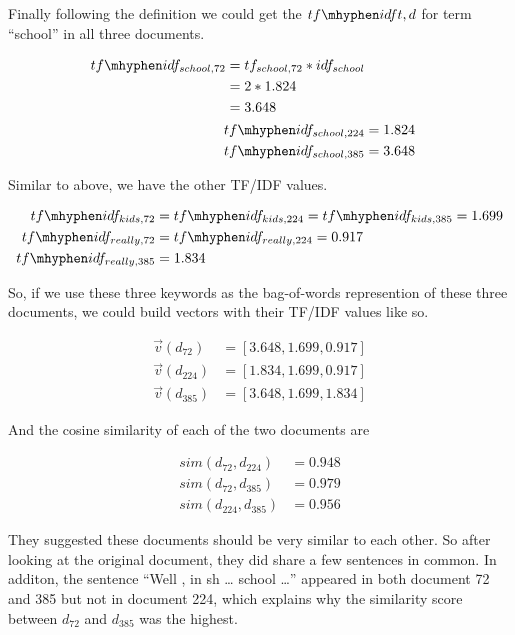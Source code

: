 \documentclass[11pt]{article} %
\begin{document}
Finally following the definition we could get the $tf\mhyphen idf{t, d}$ for term ``school'' in all three documents.

\begin{align*}
    \begin{split}
        tf\mhyphen idf_{school, 72} &= tf_{school, 72} * idf_{school} \\
            &= 2 * 1.824 \\
            &= 3.648
    \end{split}\\
    tf\mhyphen idf_{school, 224} &= 1.824 \\
    tf\mhyphen idf_{school, 385} &= 3.648
\end{align*}

Similar to above, we have the other TF/IDF values.

\begin{align*}
    tf\mhyphen idf_{kids, 72} &= tf\mhyphen idf_{kids, 224} = tf\mhyphen idf_{kids, 385} = 1.699 \\
    tf\mhyphen idf_{really, 72} &= tf\mhyphen idf_{really, 224} = 0.917 \\
    tf\mhyphen idf_{really, 385} &= 1.834
\end{align*}

So, if we use these three keywords as the bag-of-words represention of these three documents, we could build vectors with their TF/IDF values like so.

\begin{align*}
    \vec{v}(d_{72}) &= [3.648, 1.699, 0.917]\\
    \vec{v}(d_{224}) &= [1.834, 1.699, 0.917]\\
    \vec{v}(d_{385}) &= [3.648, 1.699, 1.834]
\end{align*}

And the cosine similarity of each of the two documents are

\begin{align*}
    sim(d_{72}, d_{224}) &= 0.948\\
    sim(d_{72}, d_{385}) &= 0.979\\
    sim(d_{224}, d_{385}) &= 0.956
\end{align*}

They suggested these documents should be very similar to each other. So after looking at the original document, they did share a few sentences in common. In additon, the sentence ``Well , in sh … school …'' appeared in both document 72 and 385 but not in document 224, which explains why the similarity score between $d_{72}$ and $d_{385}$ was the highest.
\end{document}
